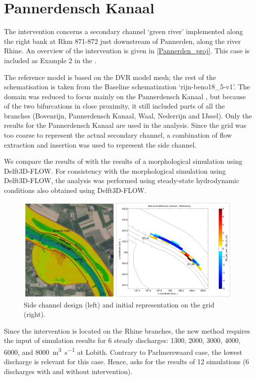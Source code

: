\section{Pannerdensch Kanaal} \label{Sec:PannerdenschCanal}
The intervention concerns a secondary channel `green river' implemented along the right bank at Rkm 871-872 just downstream of Pannerden, along the river Rhine.
An overview of the intervention is given in \autoref{Pannerden_proj}.
This case is included as Example 2 in the \citet{um}.

The reference model is based on the DVR model mesh; the rest of the schematisation is taken from the Baseline schematization ‘rijn-beno18\_5-v1’.
The domain was reduced to focus mainly on the Pannerdensch Kanaal \citep{BomLeeuwen2020}, but because of the two bifurcations in close proximity, it still included parts of all the branches (Bovenrijn, Pannerdensch Kanaal, Waal, Nederrijn and IJssel).
Only the results for the Pannerdensch Kanaal are used in the analysis.
Since the grid was too coarse to represent the actual secondary channel, a combination of flow extraction and insertion was used to represent the side channel.

We compare the results of \dfmi with the results of a morphological simulation using Delft3D-FLOW.
For consistency with the morphological simulation using Delft3D-FLOW, the \dfmi analysis was performed using steady-state hydrodynamic conditions also obtained using Delft3D-FLOW.

\begin{figure}
\includegraphics[width=\columnwidth]{figures/Pannerden_proj.png}
\caption{Side channel design (left) and initial representation on the grid (right).}
\label{Pannerden_proj}
\end{figure}

Since the intervention is located on the Rhine branches, the new \dfmi method requires the input of simulation results for 6 steady discharges: 1300, 2000, 3000, 4000, 6000, and \SI{8000}{\metre\cubed\per\second} at Lobith.
Contrary to Parlmerswaard case, the lowest discharge is relevant for this case.
Hence, \dfmi asks for the results of 12 simulations (6 discharges with and without intervention).

